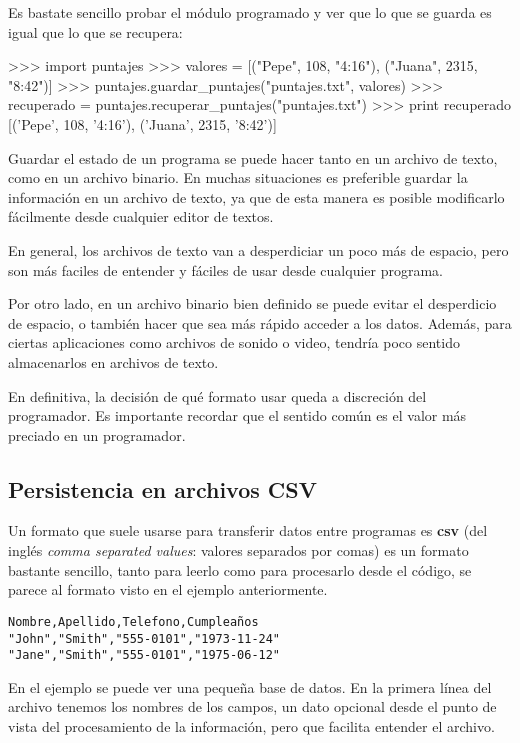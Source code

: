 Es bastate sencillo probar el módulo programado y ver que lo que se guarda
es igual que lo que se recupera:

\begin{codigo-python-sn}
>>> import puntajes
>>> valores = [("Pepe", 108, "4:16"), ("Juana", 2315, "8:42")]
>>> puntajes.guardar_puntajes("puntajes.txt", valores)
>>> recuperado = puntajes.recuperar_puntajes("puntajes.txt")
>>> print recuperado
[('Pepe', 108, '4:16'), ('Juana', 2315, '8:42')]
\end{codigo-python-sn}


Guardar el estado de un programa se puede hacer tanto en un
archivo de texto, como en un archivo binario. En muchas
situaciones es preferible guardar la información en un archivo de
texto, ya que de esta manera es posible modificarlo fácilmente
desde cualquier editor de textos.

En general, los archivos de texto van a desperdiciar un poco más de
espacio, pero son más faciles de entender y fáciles de usar desde
cualquier programa.  

Por otro lado, en un archivo binario bien definido se puede evitar el
desperdicio de espacio, o también hacer que sea más rápido acceder a los
datos.  Además, para ciertas aplicaciones como archivos de sonido o video,
tendría poco sentido almacenarlos en archivos de texto.

En definitiva, la decisión de qué formato usar queda a discreción del
programador. Es importante recordar que el sentido común es el valor más
preciado en un programador.

\subsection{Persistencia en archivos CSV}

Un formato que suele usarse para transferir datos entre programas es
\textbf{csv} (del inglés {\it comma separated values}: valores separados
por comas) es un formato bastante sencillo, tanto para leerlo como para
procesarlo desde el código, se parece al formato visto en el ejemplo
anteriormente.

\begin{verbatim}
Nombre,Apellido,Telefono,Cumpleaños
"John","Smith","555-0101","1973-11-24"
"Jane","Smith","555-0101","1975-06-12"
\end{verbatim}

En el ejemplo se puede ver una pequeña base de datos. En la primera línea
del archivo tenemos los nombres de los campos, un dato opcional desde el
punto de vista del procesamiento de la información, pero que facilita
entender el archivo. 


